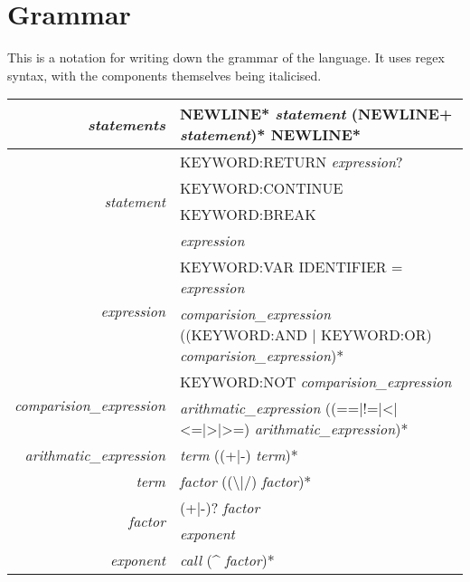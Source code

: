 \section{Grammar}

This is a notation for writing down the grammar of the language.  It uses regex syntax, with the components themselves being italicised.

\begin{tabular}{|r|l|}
\hline
\textit{statements} & NEWLINE* \textit{statement} (NEWLINE+ \textit{statement})* NEWLINE* \\\hline

\multirow{4}{*}{\textit{statement}} & KEYWORD:RETURN \textit{expression}? \\
                                    & KEYWORD:CONTINUE \\
                                    & KEYWORD:BREAK \\
                                    & \textit{expression} \\\hline
                                    
\multirow{2}{*}{\textit{expression}} & KEYWORD:VAR IDENTIFIER = \textit{expression} \\
                                     & \makecell{\textit{comparision\_expression} ((KEYWORD:AND | KEYWORD:OR)\\ \textit{comparision\_expression})*} \\\hline

\multirow{2}{*}{\textit{comparision\_expression}} & KEYWORD:NOT \textit{comparision\_expression} \\
                                                  & \textit{arithmatic\_expression} ((==|!=|<|<=|>|>=) \textit{arithmatic\_expression})* \\\hline

\textit{arithmatic\_expression} & \textit{term} ((+|-) \textit{term})* \\\hline

\textit{term} & \textit{factor} ((\textbackslash*|/) \textit{factor})* \\\hline

\multirow{2}{*}{\textit{factor}} & (+|-)? \textit{factor} \\
                                 & \textit{exponent} \\\hline

\textit{exponent} & \textit{call} (\^{} \textit{factor})* \\\hline
\end{tabular}
